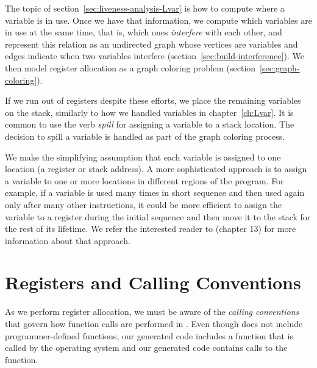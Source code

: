 \documentclass[7x10]{TimesAPriori_MIT}%
\numberwithin{theorem}{chapter}
\numberwithin{definition}{chapter}
\numberwithin{equation}{chapter}
\begin{document}
The topic of section~\ref{sec:liveness-analysis-Lvar} is how to
compute where a variable is in use.  Once we have that information, we
compute which variables are in use at the same time, that is, which ones
\emph{interfere} with each other, and
represent this relation as an undirected graph whose vertices are
variables and edges indicate when two variables interfere
(section~\ref{sec:build-interference}). We then model register
allocation as a graph coloring problem
(section~\ref{sec:graph-coloring}).

If we run out of registers despite these efforts, we place the
remaining variables on the stack, similarly to how we handled
variables in chapter~\ref{ch:Lvar}. It is common to use the verb
\emph{spill} for assigning a variable to a stack
location. The decision to spill a variable is handled as part of the
graph coloring process.

We make the simplifying assumption that each variable is assigned to
one location (a register or stack address). A more sophisticated
approach is to assign a variable to one or more locations in different
regions of the program.  For example, if a variable is used many times
in short sequence and then used again only after many other
instructions, it could be more efficient to assign the variable to a
register during the initial sequence and then move it to the stack for
the rest of its lifetime. We refer the interested reader to
\citet{Cooper:2011aa} (chapter 13) for more information about that
approach.


\section{Registers and Calling Conventions}
\label{sec:calling-conventions}

As we perform register allocation, we must be aware of the
\emph{calling conventions}  that
govern how function calls are performed in {\ArchName}.
%
Even though \LangVar{} does not include programmer-defined functions,
our generated code includes a  function that is called by
the operating system and our generated code contains calls to the
 function.
\end{document}
